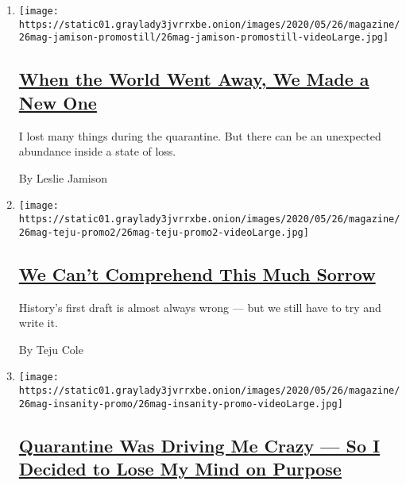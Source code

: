 \begin{enumerate}
\def\labelenumi{\arabic{enumi}.}
\item
  \texttt{[image: https://static01.graylady3jvrrxbe.onion/images/2020/05/26/magazine/26mag-jamison-promostill/26mag-jamison-promostill-videoLarge.jpg]}

  \hypertarget{when-the-world-went-away-we-made-a-new-one}{%
  \subsection{\texorpdfstring{\href{/interactive/2020/05/19/magazine/covid-quarantine-recovery.html}{When
  the World Went Away, We Made a New
  One}}{When the World Went Away, We Made a New One}}\label{when-the-world-went-away-we-made-a-new-one}}

  I lost many things during the quarantine. But there can be an
  unexpected abundance inside a state of loss.

  By Leslie Jamison
\item
  \texttt{[image: https://static01.graylady3jvrrxbe.onion/images/2020/05/26/magazine/26mag-teju-promo2/26mag-teju-promo2-videoLarge.jpg]}

  \hypertarget{we-cant-comprehend-this-much-sorrow}{%
  \subsection{\texorpdfstring{\href{/interactive/2020/05/18/magazine/covid-quarantine-sorrow.html}{We
  Can't Comprehend This Much
  Sorrow}}{We Can't Comprehend This Much Sorrow}}\label{we-cant-comprehend-this-much-sorrow}}

  History's first draft is almost always wrong --- but we still have to
  try and write it.

  By Teju Cole
\item
  \texttt{[image: https://static01.graylady3jvrrxbe.onion/images/2020/05/26/magazine/26mag-insanity-promo/26mag-insanity-promo-videoLarge.jpg]}

  \hypertarget{quarantine-was-driving-me-crazy--so-i-decided-to-lose-my-mind-on-purpose}{%
  \subsection{\texorpdfstring{\href{/interactive/2020/05/11/magazine/quarantine-insanity.html}{Quarantine
  Was Driving Me Crazy --- So I Decided to Lose My Mind on
  Purpose}}{Quarantine Was Driving Me Crazy --- So I Decided to Lose My Mind on Purpose}}\label{quarantine-was-driving-me-crazy--so-i-decided-to-lose-my-mind-on-purpose}}


\end{enumerate}
